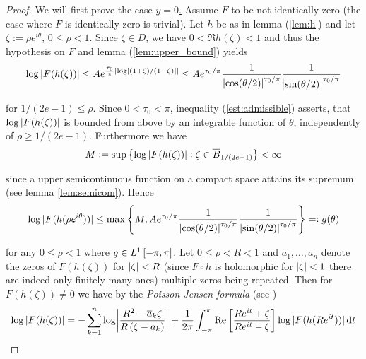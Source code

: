 \begin{proof}
	We will first prove the case \underline{$y = 0$.} Assume $F$ to be not identically zero (the case where $F$ is identically zero is trivial). Let $h$ be as in lemma (\ref{lem:h}) and let $\zeta := \rho e^{i\theta}$, $0 \leq \rho < 1$. Since $\zeta \in D$, we have $0 < \Re h(\zeta) < 1$ and thus the hypothesis on $F$ and lemma (\ref{lem:upper_bound}) yields
\begin{equation}
	\log \abs[0]{ F(h(\zeta))} \leq Ae^{\frac{\tau_0}{\pi}\abs[0]{ \log \abs[0]{\del[0]{1 + \zeta}/\del[0]{1 - \zeta}}}} \leq Ae^{\tau_0/\pi}\frac{1}{\abs[0]{ \cos(\theta/2) }^{\tau_0/\pi}}\frac{1}{\abs{ \sin(\theta/2) }^{\tau_0/\pi}}
	\label{est:admissible}
\end{equation}

\noindent for $1/(2e - 1) \leq \rho$. Since $0 < \tau_0 < \pi$, inequality (\ref{est:admissible}) asserts, that $\log \abs[0]{ F(h(\zeta))}$ is bounded from above by an integrable function of $\theta$, independently of $\rho \geq 1/(2e - 1)$. Furthermore we have 
	\begin{equation}
		M := \sup\cbr[1]{\log \abs[0]{ F(h(\zeta))} : \zeta \in \overline{B}_{1/\del[0]{2e - 1 }}} < \infty
	\end{equation}

	\noindent since a upper semicontinuous function on a compact space attains its supremum (see lemma \ref{lem:semicom}). Hence
	\begin{equation}
		\log\abs[0]{ F( h( \rho e^{i\theta} ))} \leq \max\cbr[4]{ M,   Ae^{\tau_0/\pi}\frac{1}{\abs[0]{ \cos(\theta/2) }^{\tau_0/\pi}}\frac{1}{\abs[0]{ \sin(\theta/2) }^{\tau_0/\pi}}} =: g( \theta )
		\label{est:log}
	\end{equation}

	\noindent for any $0 \leq \rho < 1$ where $g \in L^1\intcc{-\pi,\pi}$. Let $0 \leq \rho < R < 1$ and $a_1,\dots,a_n$ denote the zeros of $F(h(\zeta))$ for $\abs[0]{ \zeta} < R$ (since $F \circ h$ is holomorphic for $\abs[0]{ \zeta} < 1$ there are indeed only finitely many ones) multiple zeros being repeated. Then for $F(h(\zeta)) \neq 0$ we have by the \emph{Poisson-Jensen formula} (see \cite[208]{ahlfors:complex_analysis:1979})
	\begin{equation}
		\log\abs[0]{ F(h(\zeta))} = - \sum_{k = 1}^n \log\abs[3]{ \frac{R^2 - \overline{a}_k\zeta}{R\del[0]{ \zeta - a_k }}}	+ \frac{1}{2\pi}\int_{-\pi}^\pi \Re \sbr[3]{\frac{R e^{it} + \zeta}{R e^{it} - \zeta}}\log\abs[0]{ F(h(R e^{it}))}\d t
	\end{equation}


\end{proof}
